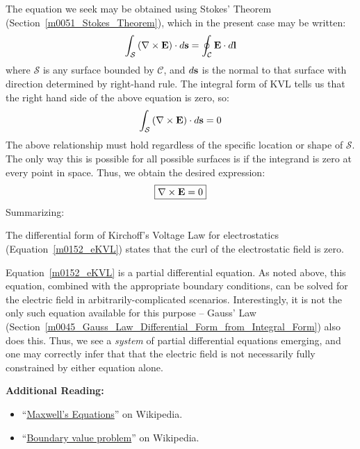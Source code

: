 The equation we seek may be obtained using Stokes' Theorem 
(Section~\ref{m0051_Stokes_Theorem}), which in the present case may be written:
%
\begin{equation}   
\int_{\mathcal S} \left( \nabla \times {\bf E} \right) \cdot d{\bf s} = \oint_{\mathcal C} {\bf E}\cdot d{\bf l}
\label{m0152_eKVL2}
\end{equation}
%
where ${\mathcal S}$ is any surface bounded by ${\mathcal C}$, and $d{\bf s}$ is the normal to that surface with direction determined by right-hand rule.
The integral form of KVL tells us that the right hand side of the above equation is zero, so:
%
\begin{equation}   
\int_{\mathcal S} \left( \nabla \times {\bf E} \right) \cdot d{\bf s} = 0
\end{equation}
%
The above relationship must hold regardless of the specific location or shape of ${\mathcal S}$.  The only way this is possible for all possible surfaces is if the integrand is zero at every point in space.  Thus, we obtain the desired expression:
%
\begin{equation}
\boxed{
\nabla \times {\bf E} = 0
}
\label{m0152_eKVL}
\end{equation}
% 
Summarizing:
%
\begin{mdframed}[backgroundcolor=yellow!20,nobreak=true] 
The differential form of Kirchoff's Voltage Law for electrostatics (Equation~\ref{m0152_eKVL}) states that the curl of the electrostatic field is zero.
\end{mdframed}

Equation~\ref{m0152_eKVL} is a partial differential equation. 
As noted above, this equation, combined with the appropriate boundary conditions, can be solved for the electric field in arbitrarily-complicated scenarios.
Interestingly, it is not the only such equation available for this purpose -- Gauss' Law (Section~\ref{m0045_Gauss_Law_Differential_Form_from_Integral_Form}) also does this.
Thus, we see a \emph{system} of partial differential equations emerging, and one may correctly infer that that the electric field is not necessarily fully constrained by either equation alone.   


{\bf Additional Reading:}
\begin{itemize}
\item ``\href{https://en.wikipedia.org/wiki/Maxwell's_equations}{Maxwell's Equations}'' on Wikipedia.
\item ``\href{https://en.wikipedia.org/wiki/Boundary_value_problem}{Boundary value problem}'' on Wikipedia.
\end{itemize}


